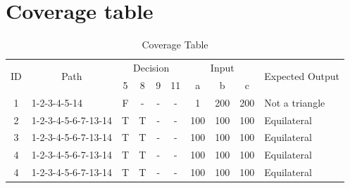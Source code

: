 \documentclass[12pt,a4paper]{article}
\newcommand{\nottriangle}{Not a triangle}
\newcommand{\equ}{Equilateral}
\begin{document}
\newpage
\section{Coverage table}

\begin{table}[hb!]
    \caption{Coverage Table}
    \label{table:coveragetable}
    \begin{center}
        \begin{tabular}[p]{ | c | l | *{7}{c|} l |}
            \hline
            \multirow{2}{*}{ID} & \multicolumn{1}{c}{\multirow{2}{*}{Path}} & \multicolumn{4}{|c|}{Decision} & \multicolumn{3}{|c|}{Input} & \multicolumn{1}{c|}{\multirow{2}{*}{Expected Output}} \\ \cline{3-8}
                                & & 5 & 8 & 9 & 11 & a & b & c & \\ \hline
            1 & 1-2-3-4-5-14        & F & - & - & - & 1   & 200 & 200 & \nottriangle    \\ \hline
            2 & 1-2-3-4-5-6-7-13-14 & T & T & - & - & 100 & 100 & 100 & \equ            \\ \hline
            3 & 1-2-3-4-5-6-7-13-14 & T & T & - & - & 100 & 100 & 100 & \equ            \\ \hline
            4 & 1-2-3-4-5-6-7-13-14 & T & T & - & - & 100 & 100 & 100 & \equ            \\ \hline
            4 & 1-2-3-4-5-6-7-13-14 & T & T & - & - & 100 & 100 & 100 & \equ            \\ \hline
        \end{tabular}
    \end{center}
\end{table}
\end{document}
